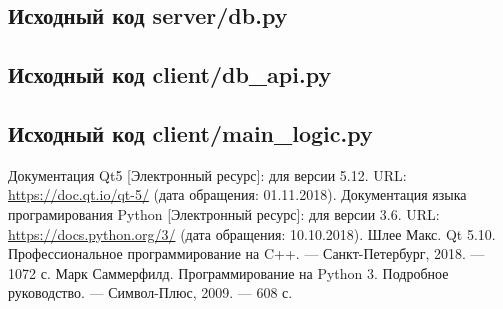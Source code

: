 \clearpage
\subsection{Исходный код server/db.py}



% 


\clearpage
\subsection{Исходный код client/db\_api.py}



\clearpage
\subsection{Исходный код client/main\_logic.py}



\clearpage
{}
\begin{thebibliography}{}
    \bibitem{}
    Документация Qt5 [Электронный ресурс]: для версии 5.12. URL: \url{https://doc.qt.io/qt-5/} (дата обращения: 01.11.2018).
    \bibitem{}
    Документация языка програмирования Python [Электронный ресурс]: для версии 3.6. URL: \url{https://docs.python.org/3/} (дата обращения: 10.10.2018).
    \bibitem{}
    Шлее Макс. Qt 5.10. Профессиональное программирование на C++. --- Санкт-Петербург, 2018. --- 1072 с.
    \bibitem{}
    Марк Саммерфилд. Программирование на Python 3. Подробное руководство. --- Символ-Плюс, 2009. --- 608 с.
\end{thebibliography}